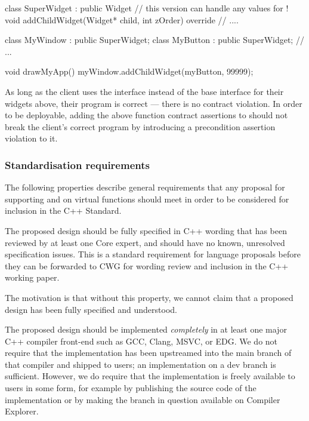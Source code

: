 \begin{codeblock}
class SuperWidget : public Widget {
  // this version can handle any values for !
  void addChildWidget(Widget* child, int zOrder) override {
    // ....
  } 
}

class MyWindow : public SuperWidget;
class MyButton : public SuperWidget;
// ...

void drawMyApp() {
  myWindow.addChildWidget(myButton, 99999);
}
\end{codeblock}
As long as the client uses the  interface instead of the base  interface for their widgets above, their program is correct --- there is no contract violation. In order to be deployable, adding the above function contract assertions to \allowbreak{} should not break the client's correct program by introducing a precondition assertion violation to it.


\subsubsection{Standardisation requirements}

The following properties describe general requirements that any proposal for supporting  and  on virtual functions should meet in order to be considered for inclusion in the C++ Standard.


The proposed design should be fully specified in C++ wording that has been reviewed by at least one Core expert, and should have no known, unresolved specification issues. This is a standard requirement for language proposals before they can be forwarded to CWG for wording review and inclusion in the C++ working paper. 

The motivation is that without this property, we cannot claim that a proposed design has been fully specified and understood.


The proposed design should be implemented \emph{completely} in at least one major C++ compiler front-end such as GCC, Clang, MSVC, or EDG. We do not require that the implementation has been upstreamed into the main branch of that compiler and shipped to users; an implementation on a dev branch is sufficient. However, we do require that the implementation is freely available to users in some form, for example by publishing the source code of the implementation or by making the branch in question available on Compiler Explorer.

